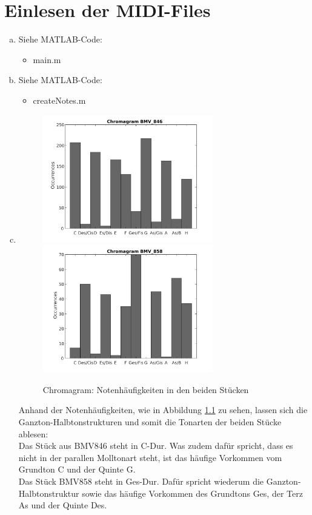 \chapter{Einlesen der MIDI-Files}


\begin{enumerate}[a)]
\item
Siehe MATLAB-Code:
\begin{itemize}
\item
main.m
\end{itemize}

\item
Siehe MATLAB-Code:
\begin{itemize}
\item
createNotes.m
\end{itemize}
\item
\begin{figure}
  \centering
      \includegraphics[width=0.7\textwidth]{Figures/Chromagram1}
      \includegraphics[width=0.7\textwidth]{Figures/Chromagram2}
 \caption{Chromagram: Notenhäufigkeiten in den beiden Stücken}
	\label{fig:chr}
\end{figure}
Anhand der Notenhäufigkeiten, wie in Abbildung \ref{fig:chr} zu sehen, lassen sich die Ganzton-Halbtonstrukturen und somit die Tonarten der beiden Stücke ablesen:\\
Das Stück aus BMV846 steht in C-Dur. Was zudem dafür spricht, dass es nicht in der parallen Molltonart steht, ist das häufige Vorkommen vom Grundton C und der Quinte G.\\
Das Stück BMV858 steht in Ges-Dur. Dafür spricht wiederum die Ganzton-Halbtonstruktur sowie das häufige Vorkommen des Grundtons Ges, der Terz As und der Quinte Des.
\end{enumerate}

